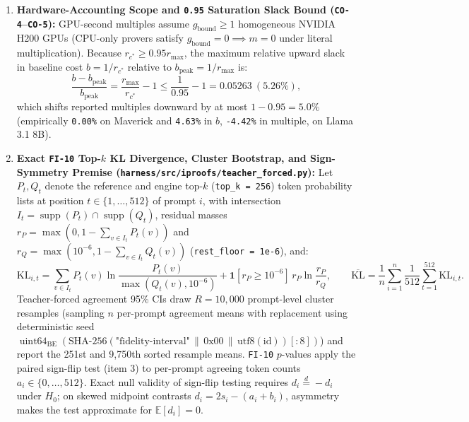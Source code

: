 \documentclass[11pt,letterpaper]{article}
\begin{document}
\begin{enumerate}
\begin{itemize}
\begin{gather*}
\operatorname{rank}(X) = 1 + \max\big(\{0\} \cup \{\operatorname{rank}(Y) : Y \in S,\; Y \prec X\}\big), \\
I(X) = \big[1 + |\{Y : Y \prec X\}|,\; |S| - |\{Z : X \prec Z\}|\big].
\end{gather*}
\end{itemize}
\item \textbf{Hardware-Accounting Scope and \texttt{0.95} Saturation Slack Bound (\texttt{CO-4}--\texttt{CO-5}):} GPU-second multiples assume $g_{\text{bound}} \ge 1$ homogeneous NVIDIA H200 GPUs (CPU-only provers satisfy $g_{\text{bound}} = 0 \implies m = 0$ under literal multiplication). Because $r_{c^*} \ge 0.95 r_{\max}$, the maximum relative upward slack in baseline cost $b = 1/r_{c^*}$ relative to $b_{\text{peak}} = 1/r_{\max}$ is:
\[
\frac{b - b_{\text{peak}}}{b_{\text{peak}}} = \frac{r_{\max}}{r_{c^*}} - 1 \le \frac{1}{0.95} - 1 = 0.05263\ (5.26\%),
\] which shifts reported multiples downward by at most $1 - 0.95 = 5.0\%$ (empirically \texttt{0.00\%} on Maverick and \texttt{4.63\%} in $b$, \texttt{-4.42\%} in multiple, on Llama 3.1 8B).
\item \textbf{Exact \texttt{FI-10} Top-$k$ KL Divergence, Cluster Bootstrap, and Sign-Symmetry Premise (\texttt{harness/\allowbreak{}src/\allowbreak{}iproofs/\allowbreak{}teacher\_\allowbreak{}forced.\allowbreak{}py}):} Let $P_t, Q_t$ denote the reference and engine top-$k$ (\texttt{top\_\allowbreak{}k = 256}) token probability lists at position $t \in \{1, \dots, 512\}$ of prompt $i$, with intersection $I_t = \operatorname{supp}(P_t) \cap \operatorname{supp}(Q_t)$, residual masses $r_P = \max(0, 1 - \sum_{v \in I_t} P_t(v))$ and $r_Q = \max(10^{-6}, 1 - \sum_{v \in I_t} Q_t(v))$ (\texttt{rest\_\allowbreak{}floor = 1e-6}), and:
\[
\text{KL}_{i,t} = \sum_{v \in I_t} P_t(v) \ln\frac{P_t(v)}{\max(Q_t(v), 10^{-6})} + \mathbf{1}[r_P \ge 10^{-6}]\, r_P \ln\frac{r_P}{r_Q}, \qquad \overline{\text{KL}} = \frac{1}{n}\sum_{i=1}^n \frac{1}{512}\sum_{t=1}^{512} \text{KL}_{i,t}.
\] Teacher-forced agreement 95\% CIs draw $R = 10{,}000$ prompt-level cluster resamples (sampling $n$ per-prompt agreement means with replacement using deterministic seed $\operatorname{uint64}_{\text{BE}}(\allowbreak \text{SHA-256}(\text{"fidelity-interval"} \,\|\,\allowbreak  \text{0x00} \,\|\,\allowbreak  \text{utf8}(\text{id}))[:8])$) and report the 251st and 9,750th sorted resample means. \texttt{FI-10} $p$-values apply the paired sign-flip test (item 3) to per-prompt agreeing token counts $a_i \in \{0, \dots, 512\}$. Exact null validity of sign-flip testing requires $d_i \stackrel{d}{=} -d_i$ under $H_0$; on skewed midpoint contrasts $d_i = 2s_i - (a_i + b_i)$, asymmetry makes the test approximate for $\mathbb{E}[d_i] = 0$.

\end{enumerate}
\end{document}
